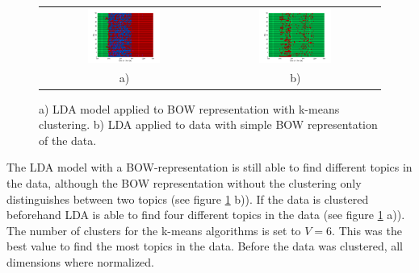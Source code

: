 \begin{figure}
 \centering
 \begin{tabular}{c c}
  \centering
  \includegraphics[width=0.45\textwidth]{Pictures/DayTopicsTs96k5Clus.png}
  &
  \includegraphics[width=0.45\textwidth]{Pictures/DayTopicsTs96k5bow.png}\\
  a) & b)
 \end{tabular}
 \caption{a) LDA model applied to BOW representation with k-means clustering. b) LDA applied to data with simple BOW representation of the data.}
 \label{fig:BOWtopics}
\end{figure}

\pagebreak
 
The LDA model with a BOW-representation is still able to find different topics in the data, although the BOW representation without the clustering only distinguishes between two topics (see figure \ref{fig:BOWtopics} b)). If the data is clustered beforehand LDA is able to find four different topics in the data (see figure \ref{fig:BOWtopics} a)). The number of clusters for the k-means algorithms is set to $V=6$. This was the best value to find the most topics in the data. Before the data was clustered, all dimensions where normalized.\\

